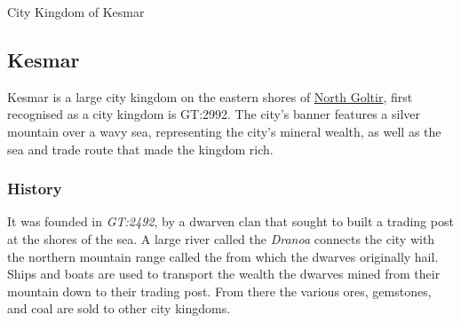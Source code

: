 \cleardoubleevenemptypage


\begin{infobox}{City Kingdom of Kesmar}
  \begin{multicols}{2}
    \begin{itemize}[label={},noitemsep,leftmargin=0.0cm,topsep=0pt]
    \end{itemize}
  \end{multicols}
\end{infobox}

\clearpage

\subsection{Kesmar}
\label{sec:Kesmar}

Kesmar is a large city kingdom on the eastern shores of
\hyperref[sec:Goltir]{North Goltir}, first recognised as a city kingdom is
GT:2992. The city's banner features a silver mountain over a wavy sea,
representing the city's mineral wealth, as well as the sea and trade route
that made the kingdom rich.

\subsubsection{History}

It was founded in \emph{GT:2492}, by a dwarven clan that sought to built a
trading post at the shores of the sea. A large river called the \emph{Dranoa}
connects the city with the northern mountain range called the
 from which the dwarves originally hail. Ships
and boats are used to transport the wealth the dwarves mined from their
mountain down to their trading post. From there the various ores, gemstones,
and coal are sold to other city kingdoms.

